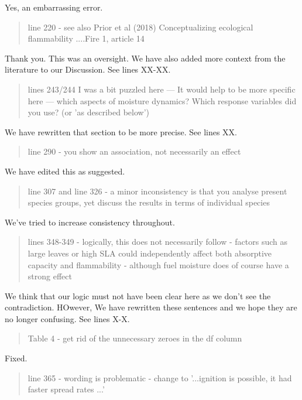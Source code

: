 \documentclass[letterpaper, 12pt]{letter}
\begin{document}
\begin{letter}{}
Yes, an embarrassing error.

\begin{quote}
  line 220 - see also Prior et al (2018) Conceptualizing ecological
  flammability ....Fire 1, article 14
\end{quote}

Thank you. This was an oversight. We have also added more context from the
literature to our Discussion. See lines XX-XX.


\begin{quote}
  lines 243/244 I was a bit puzzled here --- It would help to be more specific
  here --- which aspects of moisture dynamics? Which response variables did you
  use? (or 'as described below')
\end{quote}

We have rewritten that section to be more precise.  See lines XX.

\begin{quote}
line 290 - you show an association, not necessarily an effect
\end{quote}

We have edited this as suggested.

\begin{quote}
  line 307 and line 326 - a minor inconsistency is that you analyse present
  species groups, yet discuss the results in terms of individual species
\end{quote}

We've tried to increase consistency throughout. 

\begin{quote}
  lines 348-349 - logically, this does not necessarily follow - factors such as
  large leaves or high SLA could independently affect both absorptive capacity
  and flammability - although fuel moisture does of course have a strong effect
\end{quote}

We think that our logic must not have been clear here as we don't see the
contradiction. HOwever, We have rewritten these sentences and we hope they are
no longer confusing. See lines X-X.

\begin{quote}
Table 4 - get rid of the unnecessary zeroes in the df column
\end{quote}

Fixed.

\begin{quote}
  line 365 - wording is problematic - change to '...ignition is possible, it
  had faster spread rates ...'
\end{quote}


\end{letter}
\end{document}
